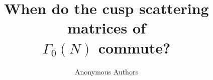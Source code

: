 \documentclass[11pt]{article}
\title{When do the cusp scattering matrices of\\
  $\Gamma_0(N)$ commute?}
\author{Anonymous Authors}
\date{}
\begin{document}
\maketitle
\begin{abstract}

\end{abstract}










\end{document}
